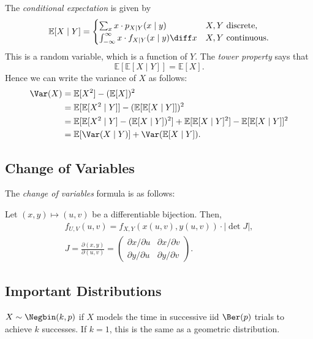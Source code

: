 \documentclass[12pt]{article}
\begin{document}
The \emph{conditional expectation} is given by
\[
\mathbb{E}[X \mid Y] =
\begin{cases}
	\sum_{x} x \cdot p_{X \mid Y}(x \mid y) & X,Y \text{ discrete},\\
	\int_{-\infty}^{\infty}x \cdot f_{X\mid Y}(x\mid y) \diff x & X,Y \text{ continuous}.
\end{cases}
\]
This is a random variable, which is a function of $Y$. The \emph{tower property} says that
\[
\mathbb{E}[\mathbb{E}[X \mid Y]] = \mathbb{E}[X]
.\]
Hence we can write the variance of $X$ as follows:
\begin{align*}
	\Var(X) &= \mathbb{E}[X^2] - (\mathbb{E}[X])^2 \\
		&= \mathbb{E}[\mathbb{E}[X^2 \mid Y]] - (\mathbb{E}[\mathbb{E}[X \mid Y]])^2 \\
		&= \mathbb{E}[\mathbb{E}[X^2\mid Y] - (\mathbb{E}[X \mid Y])^2] + \mathbb{E}[\mathbb{E}[X\mid Y]^2] - \mathbb{E}[\mathbb{E}[X\mid Y]]^2 \\
		&= \mathbb{E}[\Var(X\mid Y)] + \Var(\mathbb{E}[X\mid Y]).
\end{align*}

\subsection{Change of Variables}
\label{sub:change_of_variables}

The \emph{change of variables} formula is as follows:

Let $(x, y) \mapsto (u, v)$ be a differentiable bijection. Then,
\begin{align*}
	f_{U,V}(u,v) = f_{X,Y}(x(u,v),y(u,v)) \cdot |\!\det J|, \\
	J = \frac{\partial (x, y)}{\partial (u, v)} =
	\begin{pmatrix}
		\partial x/\partial u & \partial x/\partial v \\
		\partial y/\partial u & \partial y/\partial v
	\end{pmatrix}.
\end{align*}

\subsection{Important Distributions}
\label{sub:important_distributions}

$X \sim \Negbin(k, p)$ if $X$ models the time in successive iid $\Ber(p)$ trials to achieve $k$ successes. If $k = 1$, this is the same as a geometric distribution.
\end{document}

